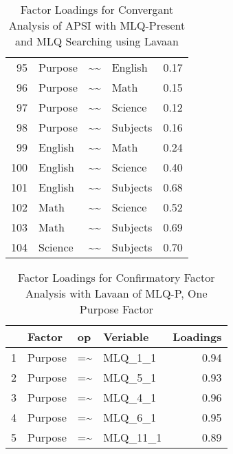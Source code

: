 \documentclass{article}\usepackage[]{graphicx}\usepackage[]{color}
\begin{document}
\begin{table}[ht]
\begin{tabular}{rlllr}
  95 & Purpose & \~{}\~{} & English & 0.17 \\ 
  96 & Purpose & \~{}\~{} & Math & 0.15 \\ 
  97 & Purpose & \~{}\~{} & Science & 0.12 \\ 
  98 & Purpose & \~{}\~{} & Subjects & 0.16 \\ 
  99 & English & \~{}\~{} & Math & 0.24 \\ 
  100 & English & \~{}\~{} & Science & 0.40 \\ 
  101 & English & \~{}\~{} & Subjects & 0.68 \\ 
  102 & Math & \~{}\~{} & Science & 0.52 \\ 
  103 & Math & \~{}\~{} & Subjects & 0.69 \\ 
  104 & Science & \~{}\~{} & Subjects & 0.70 \\ 
   \hline
\end{tabular}
\caption{Factor Loadings for Convergant Analysis of APSI with MLQ-Present and MLQ Searching using Lavaan} 
\end{table}

\begin{table}[ht]
\centering
\begin{tabular}{rlllr}
  \hline
 & Factor & op & Veriable & Loadings \\ 
  \hline
1 & Purpose & =\~{} & MLQ\_1\_1 & 0.94 \\ 
  2 & Purpose & =\~{} & MLQ\_5\_1 & 0.93 \\ 
  3 & Purpose & =\~{} & MLQ\_4\_1 & 0.96 \\ 
  4 & Purpose & =\~{} & MLQ\_6\_1 & 0.95 \\ 
  5 & Purpose & =\~{} & MLQ\_11\_1 & 0.89 \\ 
   \hline
\end{tabular}
\caption{Factor Loadings for Confirmatory Factor Analysis with Lavaan of MLQ-P, One Purpose Factor} 
\end{table}
\end{document}
